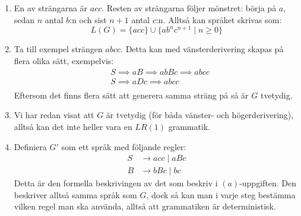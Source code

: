 \documentclass{article}
\begin{document}
\section{}

\begin{enumerate}[label=(\alph*)]
    \item 
        En av strängarna är $acc$. Resten av strängarna följer mönstret: börja på $a$, sedan $n$ antal $b$:n och sist $n+1$ antal $c$:n. Alltså kan språket skrivas som:
        $$L(G) =\{acc\} \cup \{ab^nc^{n+1} \mid n \ge 0 \}$$
    \item
        Ta till exempel strängen $abcc$. Detta kan med vänsterderivering skapas på flera olika sätt, exempelvis:
        \begin{align*}
        &S \implies aB  \implies abBc \implies abcc \\
        &S \implies aDc \implies abcc \\
        \end{align*}
        Eftersom det finns flera sätt att generera samma sträng på så är $G$ tvetydig.
        
    \item 
        Vi har redan visat att $G$ är tvetydig (för båda vänster- och högerderivering), alltså kan det inte heller vara en $LR(1)$ grammatik.
    \item
        Definiera $G'$ som ett språk med följande regler:
        \begin{align*}
            S & \to acc \mid aBc \\
            B & \to bBc \mid bc
        \end{align*}
        Detta är den formella beskrivingen av det som beskriv i $(a)$-uppgiften. Den beskriver alltså samma språk som $G$, dock så kan man i varje steg bestämma vilken regel man ska använda, alltså att grammatiken är deterministisk.

\end{enumerate}

\section{}
\end{document}
